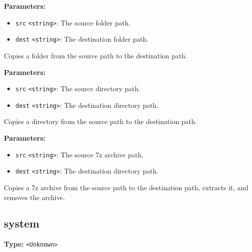\documentclass[12pt,a4paper]{article}
\begin{document}
\noindent \textbf{Parameters:}
\begin{itemize}
  \item \texttt{src} \texttt{<string>}: The source folder path.
  \item \texttt{dest} \texttt{<string>}: The destination folder path.
\end{itemize}

\noindent Copies a folder from the source path to the destination path.

\vspace{5mm}
\noindent {}


\noindent \textbf{Parameters:}
\begin{itemize}
  \item \texttt{src} \texttt{<string>}: The source directory path.
  \item \texttt{dest} \texttt{<string>}: The destination directory path.
\end{itemize}

\noindent Copies a directory from the source path to the destination path.

\vspace{5mm}
\noindent {}


\noindent \textbf{Parameters:}
\begin{itemize}
  \item \texttt{src} \texttt{<string>}: The source 7z archive path.
  \item \texttt{dest} \texttt{<string>}: The destination directory path.
\end{itemize}

\noindent Copies a 7z archive from the source path to the destination path, extracts it, and removes the archive.


\subsection{system}
\vspace{5mm}
\noindent {}\vspace{4mm}


\noindent \textbf{Type:} \texttt{<Unknown>}
\end{document}
